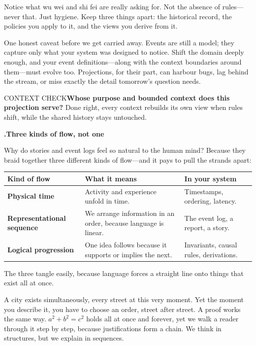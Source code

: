 \documentclass[10pt,a4paper]{article}
\newcounter{movement}
\newcounter{sub}[movement]
\renewcommand{\thesub}{\arabic{movement}.\arabic{sub}}
\newcommand{\Checkpoint}[2]{\begin{checkbox}{#1}#2\end{checkbox}}
\newcommand{\SubHead}[1]{%
  \par\Needspace{5\baselineskip}\stepcounter{sub}\vspace{2mm}%
  {\ttfamily\bfseries\footnotesize\textcolor{G2}{\thesub}\enspace\sffamily\bfseries\normalsize #1\par}%
  \vspace{0.6mm}%
}
\begin{document}
Notice what wu wei and shi fei are really asking for. Not the absence of rules—never that. Just hygiene. Keep three things apart: the historical record, the policies you apply to it, and the views you derive from it.

One honest caveat before we get carried away. Events are still a model; they capture only what your system was designed to notice. Shift the domain deeply enough, and your event definitions—along with the context boundaries around them—must evolve too. Projections, for their part, can harbour bugs, lag behind the stream, or miss exactly the detail tomorrow's question needs.

\Checkpoint{CONTEXT CHECK}{\textbf{Whose purpose and bounded context does this projection serve?} Done right, every context rebuilds its own view when rules shift, while the shared history stays untouched.}

\SubHead{Three kinds of flow, not one}

Why do stories and event logs feel so natural to the human mind? Because they braid together three different kinds of flow—and it pays to pull the strands apart:

\begin{center}
\small\renewcommand{\arraystretch}{1.4}
\begin{tabularx}{\linewidth}{@{}>{\raggedright\sffamily\bfseries}p{37mm}XX@{}}
\toprule
\textbf{Kind of flow} & \sffamily\textbf{What it means} & \sffamily\textbf{In your system} \\ \midrule
Physical time & Activity and experience unfold in time. & Timestamps, ordering, latency. \\ \midrule
Representational sequence & We arrange information in an order, because language is linear. & The event log, a report, a story. \\ \midrule
Logical progression & One idea follows because it supports or implies the next. & Invariants, causal rules, derivations. \\
\bottomrule
\end{tabularx}
\end{center}

The three tangle easily, because language forces a straight line onto things that exist all at once.

A city exists simultaneously, every street at this very moment. Yet the moment you describe it, you have to choose an order, street after street. A proof works the same way. \(a^2+b^2=c^2\) holds all at once and forever, yet we walk a reader through it step by step, because justifications form a chain. We think in structures, but we explain in sequences.
\end{document}
